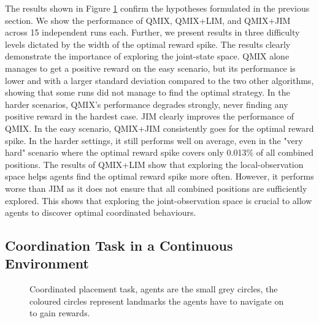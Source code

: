 \begin{figure}
     \label{fig:JIM:ro_results}
\end{figure}

The results shown in Figure \ref{fig:JIM:ro_results} confirm the hypotheses formulated in the previous section. We show the performance of QMIX, QMIX+LIM, and QMIX+JIM across 15 independent runs each. Further, we present results in three difficulty levels dictated by the width of the optimal reward spike. The results clearly demonstrate the importance of exploring the joint-state space. QMIX alone manages to get a positive reward on the easy scenario, but its performance is lower and with a larger standard deviation compared to the two other algorithms, showing that some runs did not manage to find the optimal strategy. In the harder scenarios, QMIX's performance degrades strongly, never finding any positive reward in the hardest case. JIM clearly improves the performance of QMIX. In the easy scenario, QMIX+JIM consistently goes for the optimal reward spike. In the harder settings, it still performs well on average, even in the "very hard" scenario where the optimal reward spike covers only 0.013\% of all combined positions. The results of QMIX+LIM show that exploring the local-observation space helps agents find the optimal reward spike more often. However, it performs worse than JIM as it does not ensure that all combined positions are sufficiently explored. This shows that exploring the joint-observation space is crucial to allow agents to discover optimal coordinated behaviours.





\subsection{Coordination Task in a Continuous Environment}

\begin{figure}[h]
    \centering
    \setlength{\fboxsep}{0pt}
    \setlength{\fboxrule}{1pt}
    \caption{Coordinated placement task, agents are the small grey circles, the coloured circles represent landmarks the agents have to navigate on to gain rewards.}
    \label{fig:JIM:coord_place}
\end{figure}

